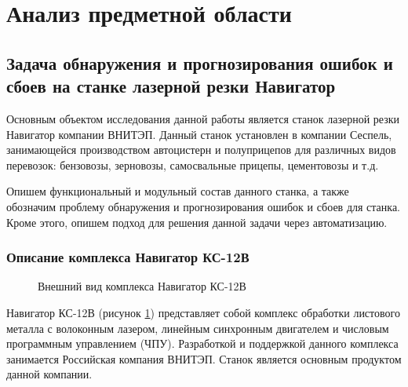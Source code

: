 \section{Анализ предметной области}

\subsection{Задача обнаружения и прогнозирования ошибок и сбоев на станке лазерной резки Навигатор}

Основным объектом исследования данной работы является станок лазерной резки Навигатор
компании ВНИТЭП. Данный станок установлен в компании Сеспель,
занимающейся производством автоцистерн и полуприцепов для различных видов перевозок:
бензовозы, зерновозы, самосвальные прицепы, цементовозы и т.д.

Опишем функциональный и модульный состав данного станка, а также обозначим
проблему обнаружения и прогнозирования ошибок и сбоев для станка.
Кроме этого, опишем подход для решения данной задачи через автоматизацию.

\subsubsection{Описание комплекса Навигатор КС-12В}

\begin{figure}[h]
    \caption{Внешний вид комплекса Навигатор КС-12В}
    \label{navigator}
\end{figure}

Навигатор КС-12В (рисунок \ref{navigator})  представляет собой комплекс обработки листового металла с волоконным лазером,
линейным синхронным двигателем и числовым программным управлением (ЧПУ).
Разработкой и поддержкой данного комплекса занимается Российская компания ВНИТЭП.
Станок является основным продуктом данной компании.

